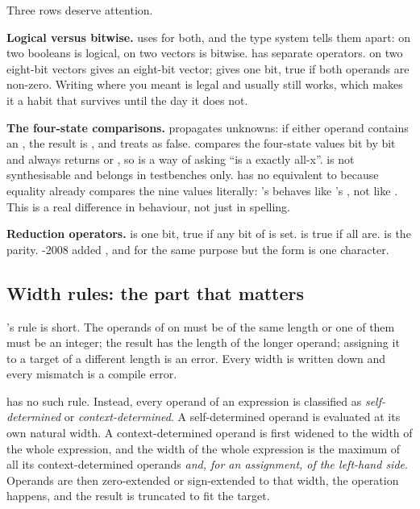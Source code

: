Three rows deserve attention.

\textbf{Logical versus bitwise.} \VHDL{} uses  for both, and the type
system tells them apart:  on two booleans is logical, on two vectors
is bitwise. \SV{} has separate operators.  on two eight-bit
vectors gives an eight-bit vector;  gives one bit, true if both
operands are non-zero. Writing  where you meant \code{\&\&}
is legal and usually still works, which makes it a habit that survives until
the day it does not.

\textbf{The four-state comparisons.} \code{==} propagates unknowns: if either
operand contains an , the result is , and  treats
 as false. \code{===} compares the four-state values bit by bit and
always returns  or , so  is a way of asking
``is a exactly all-x''. \code{===} is not synthesisable and belongs in
testbenches only. \VHDL{} has no equivalent to \code{==} because
 equality already compares the nine values literally: \VHDL{}'s
\code{=} behaves like \SV{}'s \code{===}, not like \code{==}. This is a real
difference in behaviour, not just in spelling.

\textbf{Reduction operators.}  is one bit, true if any bit of 
is set.  is true if all are.  is the parity.
\VHDL{}-2008 added ,  and 
for the same purpose but the \SV{} form is one character.

\subsection{Width rules: the part that matters}


\VHDL{}'s rule is short. The operands of \code{+} on  must be of
the same length or one of them must be an integer; the result has the length of
the longer operand; assigning it to a target of a different length is an error.
Every width is written down and every mismatch is a compile error.

\SV{} has no such rule. Instead, every operand of an expression is classified
as \emph{self-determined} or \emph{context-determined}. A self-determined
operand is evaluated at its own natural width. A context-determined operand is
first widened to the width of the whole expression, and the width of the whole
expression is the maximum of all its context-determined operands \emph{and,
for an assignment, of the left-hand side}. Operands are then zero-extended or
sign-extended to that width, the operation happens, and the result is
truncated to fit the target.

